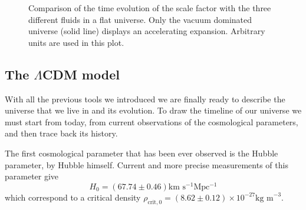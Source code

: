 \begin{figure}[h]
    \centering
    \label{fig:a_comparison}
    \caption{Comparison of the time evolution of the scale factor with the three different fluids in a flat universe. Only the vacuum dominated universe (solid line) displays an accelerating expansion. Arbitrary units are used in this plot.}
\end{figure}
\subsection{The $\Lambda$CDM model} 
\label{sec:LambdaCDM}
With all the previous tools we introduced we are finally ready to describe the universe that we live in and its evolution. To draw the timeline of our universe we must start from today, from current observations of the cosmological parameters, and then trace back its history.

The first cosmological parameter that has been ever observed is the Hubble parameter, by Hubble himself. Current and more precise measurements of this parameter give
$$H_0=(67.74\pm0.46)\text{km s$^{-1}$Mpc$^{-1}$}$$
which correspond to a critical density $\rho_{\text{crit},0}=(8.62\pm0.12)\times10^{-27}\text{kg m}^{-3}$.

